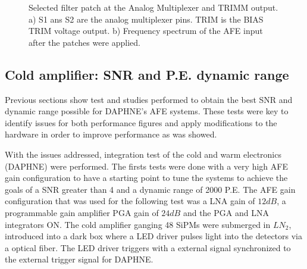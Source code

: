 \begin{figure}[h]
\centering
{}
\caption[]{Selected filter patch at the Analog Multiplexer and TRIMM output.  a) S1 ans S2 are the analog multiplexer pins. TRIM is the BIAS TRIM voltage output. b)  Frequency spectrum  of the AFE input after the patches were applied.}
\label{fig:patches}
\end{figure}


\subsection{Cold amplifier: SNR and P.E. dynamic range}

Previous sections show test and studies performed to obtain the best SNR and dynamic range possible for DAPHNE's AFE systems. These tests were key to identify issues for both performance figures and apply modifications to the hardware in order to improve performance as was showed.

With the issues addressed, integration test of the cold and warm electronics (DAPHNE) were performed. The firsts tests were done with a very high AFE gain configuration to have a starting point to tune the systems to achieve the goals of a SNR greater than 4 and a dynamic range of 2000 P.E. The AFE gain configuration that was used for the following test was a LNA gain of $12dB$, a programmable gain amplifier PGA gain of $24dB$ and the PGA and LNA integrators ON. The cold amplifier ganging 48 SiPMs were submerged in $LN_2$, introduced into a dark box where a LED driver pulses light into the detectors via a optical fiber. The LED driver triggers with a external signal synchronized to the external trigger signal for DAPHNE.

